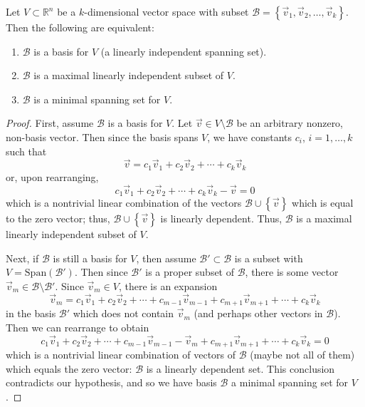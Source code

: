 \begin{prop} 
Let $V\subset \mathbb{R}^n$ be a $k$-dimensional vector space with subset $\mathcal{B} = \left\{\vec{v}_1, \vec{v}_2,\ldots, \vec{v}_k\right\}$. Then the following are equivalent:
\begin{enumerate}
	\item $\mathcal{B}$ is a basis for $V$ (a linearly independent spanning set).
	\item $\mathcal{B}$ is a maximal linearly independent subset of $V$.
	\item $\mathcal{B}$ is a minimal spanning set for $V$.
\end{enumerate}
\end{prop}

\begin{proof}
First, assume $\mathcal{B}$ is a basis for $V$. Let $\vec{v} \in V\setminus \mathcal{B}$ be an arbitrary nonzero, non-basis vector. Then since the basis spans $V$, we have constants $c_i$, $i=1,\ldots,k$ such that \[ \vec{v} = c_1 \vec{v}_1 + c_2 \vec{v}_2 + \cdots + c_k \vec{v}_k \] or, upon rearranging,
\[c_1 \vec{v}_1 + c_2 \vec{v}_2 + \cdots + c_k \vec{v}_k - \vec{v} = 0 \] which is a nontrivial linear combination of the vectors $\mathcal{B} \cup \left\{ \vec{v} \right\}$ which is equal to the zero vector; thus, $\mathcal{B} \cup \left\{ \vec{v} \right\}$ is linearly dependent. Thus, $\mathcal{B}$ is a maximal linearly independent subset of $V$.

Next, if $\mathcal{B}$ is still a basis for $V$, then assume $\mathcal{B}' \subset \mathcal{B}$ is a subset with $V = \text{Span} \left( \mathcal{B}'\right)$. Then since $\mathcal{B}'$ is a proper subset of $\mathcal{B}$, there is some vector $\vec{v}_m \in \mathcal{B}\setminus \mathcal{B}'$. Since $\vec{v}_m \in V$, there is an expansion \[ \vec{v}_m = c_1 \vec{v}_1 + c_2 \vec{v}_2 + \cdots + c_{m-1} \vec{v}_{m-1} + c_{m+1} \vec{v}_{m+1} + \cdots + c_k \vec{v}_k \] in the basis $\mathcal{B}'$ which does not contain $\vec{v}_m$ (and perhaps other vectors in $\mathcal{B}$). Then we can rearrange to obtain \[ c_1 \vec{v}_1 + c_2 \vec{v}_2 + \cdots + c_{m-1} \vec{v}_{m-1} - \vec{v}_m + c_{m+1} \vec{v}_{m+1} + \cdots + c_k \vec{v}_k = 0 \] which is a nontrivial linear combination of vectors of $\mathcal{B}$ (maybe not all of them) which equals the zero vector: $\mathcal{B}$ is a linearly dependent set. This conclusion contradicts our hypothesis, and so we have basis $\mathcal{B}$ a minimal spanning set for $V$.


\end{proof}
